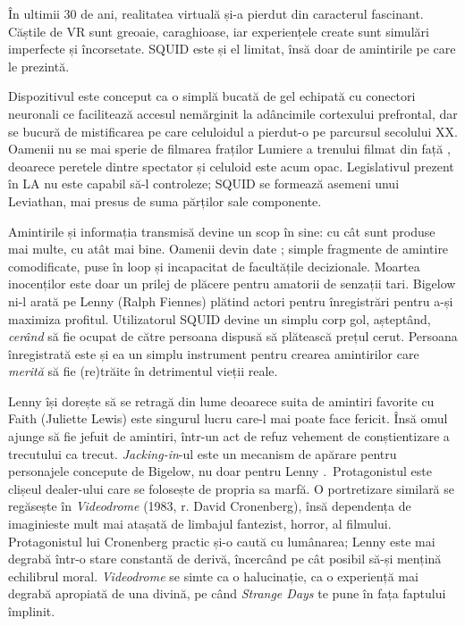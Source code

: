 \documentclass[12pt]{article}
\begin{document}
În ultimii 30 de ani, realitatea virtuală și-a pierdut din caracterul fascinant. Căștile de VR sunt greoaie, caraghioase, iar experiențele create sunt simulări imperfecte și încorsetate. SQUID este și el limitat, însă doar de amintirile pe care le prezintă.\par

Dispozitivul este conceput ca o simplă bucată de gel echipată cu conectori neuronali ce facilitează accesul nemărginit la adâncimile cortexului prefrontal, dar se bucură de mistificarea pe care celuloidul a pierdut-o pe parcursul secolului XX. Oamenii nu se mai sperie de filmarea fraților Lumiere a trenului filmat din față \cite{Willistein1995a}, deoarece peretele dintre spectator și celuloid este acum opac. Legislativul prezent în LA nu este capabil să-l controleze; SQUID se formează asemeni unui Leviathan, mai presus de suma părților sale componente.\par

Amintirile și informația transmisă devine un scop în sine: cu cât sunt produse mai multe, cu atât mai bine. Oamenii devin date \cite{Vishnevetsky2012a}; simple fragmente de amintire comodificate, puse în loop și incapacitat de facultățile decizionale. Moartea inocenților este doar un prilej de plăcere pentru amatorii de senzații tari. Bigelow ni-l arată pe Lenny (Ralph Fiennes) plătind actori pentru înregistrări pentru a-și maximiza profitul. Utilizatorul SQUID devine un simplu corp gol, așteptând, \textit{cerând} să fie ocupat de către persoana dispusă să plătească prețul cerut. Persoana înregistrată este și ea un simplu instrument pentru crearea amintirilor care \textit{merită} să fie (re)trăite în detrimentul vieții reale.\par

Lenny își dorește să se retragă din lume deoarece suita de amintiri favorite cu Faith (Juliette Lewis) este singurul lucru care-l mai poate face fericit. Însă omul ajunge să fie jefuit de amintiri, într-un act de refuz vehement de conștientizare a trecutului ca trecut. \textit{Jacking-in}-ul este un mecanism de apărare pentru personajele concepute de Bigelow, nu doar pentru Lenny \cite{Palermo2020a}. Protagonistul este clișeul dealer-ului care se folosește de propria sa marfă. O portretizare similară se regăsește în \textit{Videodrome} (1983, r. David Cronenberg), însă \dedouble dependența de imagini\sqtworight este mult mai atașată de limbajul fantezist, horror, al filmului. Protagonistul lui Cronenberg practic și-o caută cu lumânarea; Lenny este mai degrabă într-o stare constantă de derivă, încercând pe cât posibil să-și mențină echilibrul moral. \textit{Videodrome} se simte ca o halucinație, ca o experiență mai degrabă apropiată de una divină, pe când \textit{Strange Days} te pune în fața faptului împlinit.\par
\end{document}
